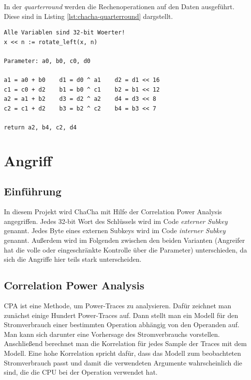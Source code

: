 \documentclass[a4paper,ngerman]{scrreprt}
\begin{document}
\medskip

In der \emph{quarterround} werden die Rechenoperationen auf den Daten
ausgeführt. Diese sind in Listing \autoref{lst:chacha-quarterround} dargstellt.

\begin{lstlisting}[caption={ChaCha quarterround}, label=lst:chacha-quarterround]
Alle Variablen sind 32-bit Woerter!
x << n := rotate_left(x, n)

Parameter: a0, b0, c0, d0

a1 = a0 + b0    d1 = d0 ^ a1    d2 = d1 << 16
c1 = c0 + d2    b1 = b0 ^ c1    b2 = b1 << 12
a2 = a1 + b2    d3 = d2 ^ a2    d4 = d3 << 8
c2 = c1 + d2    b3 = b2 ^ c2    b4 = b3 << 7

return a2, b4, c2, d4
\end{lstlisting}




\chapter{Angriff}

\section{Einführung}

In diesem Projekt wird ChaCha mit Hilfe der Correlation Power Analysis
angegriffen. Jedes 32-bit Wort des Schlüssels wird im Code \emph{externer
Subkey} genannt. Jedes Byte eines externen Subkeys wird im Code \emph{interner
Subkey} genannt. Außerdem wird im Folgenden zwischen den beiden Varianten
(Angreifer hat die volle oder eingeschränkte Kontrolle über die Parameter)
unterschieden, da sich die Angriffe hier teils stark unterscheiden.


\section{Correlation Power Analysis}
\label{sec:cpa}

CPA ist eine Methode, um Power-Traces zu analysieren. Dafür zeichnet man
zunächst einige Hundert Power-Traces auf. Dann stellt man ein Modell für den
Stromverbrauch einer bestimmten Operation abhängig von den Operanden auf. Man
kann sich darunter eine Vorhersage des Stromverbrauchs vorstellen. Anschließend
berechnet man die Korrelation für jedes Sample der Traces mit dem Modell. Eine
hohe Korrelation spricht dafür, dass das Modell zum beobachteten Stromverbrauch
passt und damit die verwendeten Argumente wahrscheinlich die sind, die die CPU
bei der Operation verwendet hat.
\end{document}
